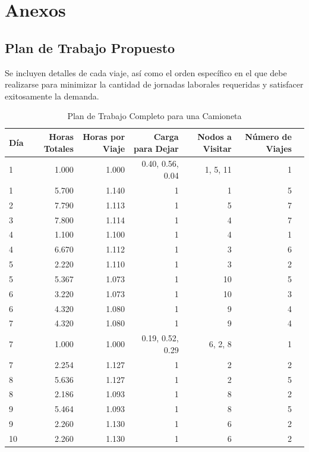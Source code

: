 \documentclass{amsart}
\begin{document}
\newpage
\section{Anexos}

    \subsection{Plan de Trabajo Propuesto}
    Se incluyen detalles de cada viaje, así como el orden específico en el que debe realizarse para minimizar la cantidad de jornadas laborales requeridas y satisfacer exitosamente la demanda.
    
    \begin{table}[!htp]\centering
        \caption{Plan de Trabajo Completo para una Camioneta}\label{DistribucionViajes}
        \scriptsize
        \begin{tabular}{lrrrrrr}\toprule
        \textbf{Día} &\textbf{Horas Totales} &\textbf{Horas por Viaje} &\textbf{Carga para Dejar} &\textbf{Nodos a Visitar} &\textbf{Número de Viajes} \\\midrule
        1 &1.000 &1.000 &0.40, 0.56, 0.04 &1, 5, 11 &1 \\
        1 &5.700 &1.140 &1 &1 &5 \\
        2 &7.790 &1.113 &1 &5 &7 \\
        3 &7.800 &1.114 &1 &4 &7 \\
        4 &1.100 &1.100 &1 &4 &1 \\
        4 &6.670 &1.112 &1 &3 &6 \\
        5 &2.220 &1.110 &1 &3 &2 \\
        5 &5.367 &1.073 &1 &10 &5 \\
        6 &3.220 &1.073 &1 &10 &3 \\
        6 &4.320 &1.080 &1 &9 &4 \\
        7 &4.320 &1.080 &1 &9 &4 \\
        7 &1.000 &1.000 &0.19, 0.52, 0.29 &6, 2, 8 &1 \\
        7 &2.254 &1.127 &1 &2 &2 \\
        8 &5.636 &1.127 &1 &2 &5 \\
        8 &2.186 &1.093 &1 &8 &2 \\
        9 &5.464 &1.093 &1 &8 &5 \\
        9 &2.260 &1.130 &1 &6 &2 \\
        10 &2.260 &1.130 &1 &6 &2 \\

\end{tabular}
\end{table}
\end{document}
